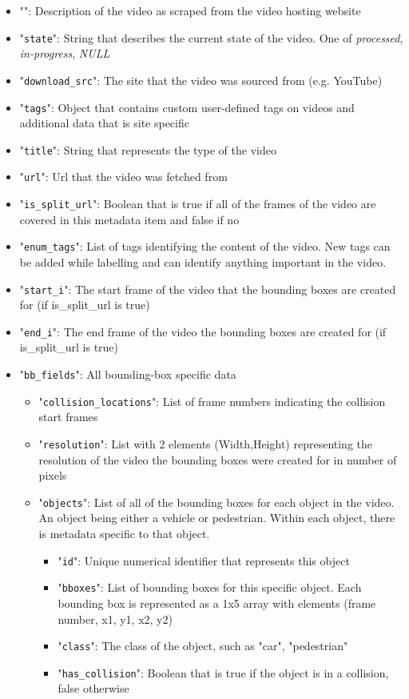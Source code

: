 \documentclass[letterpaper, 10 pt, conference]{ieeeconf}
\begin{document}
\begin{itemize}
  \item "\texttt{}": Description of the video as scraped from the video hosting website
  \item "\texttt{state}": String that describes the current state of the video. One of \textit{processed}, \textit{in-progress}, \textit{NULL}
  \item "\texttt{download\_src}": The site that the video was sourced from (e.g. YouTube)
  \item "\texttt{tags}": Object that contains custom user-defined tags on videos and additional data that is site specific
  \item "\texttt{title}": String that represents the type of the video
  \item "\texttt{url}": Url that the video was fetched from
  \item "\texttt{is\_split\_url}": Boolean that is true if all of the frames of the video are covered in this metadata item and false if no
  \item "\texttt{enum\_tags}": List of tags identifying the content of the video. New tags can be added while labelling and can identify anything important in the video.
  \item "\texttt{start\_i}": The start frame of the video that the bounding boxes are created for (if is\_split\_url is true)
  \item "\texttt{end\_i}": The end frame of the video the bounding boxes are created for (if is\_split\_url is true)
  \item "\texttt{bb\_fields}": All bounding-box specific data
  \begin{itemize}
    \item "\texttt{collision\_locations}": List of frame numbers indicating the collision start frames
    \item "\texttt{resolution}": List with 2 elements (Width,Height) representing the resolution of the video the bounding boxes were created for in number of pixels 
    \item "\texttt{objects}": List of all of the bounding boxes for each object in the video. An object being either a vehicle or pedestrian. Within each object, there is metadata specific to that object.
    \begin{itemize}
      \item "\texttt{id}": Unique numerical identifier that represents this object
      \item "\texttt{bboxes}": List of bounding boxes for this specific object. Each bounding box is represented as a 1x5 array with elements (frame number, x1, y1, x2, y2)
      \item "\texttt{class}": The class of the object, such as "car", "pedestrian"
      \item "\texttt{has\_collision}": Boolean that is true if the object is in a collision, false otherwise
    \end{itemize}
  \end{itemize}
\end{itemize}
\end{document}
